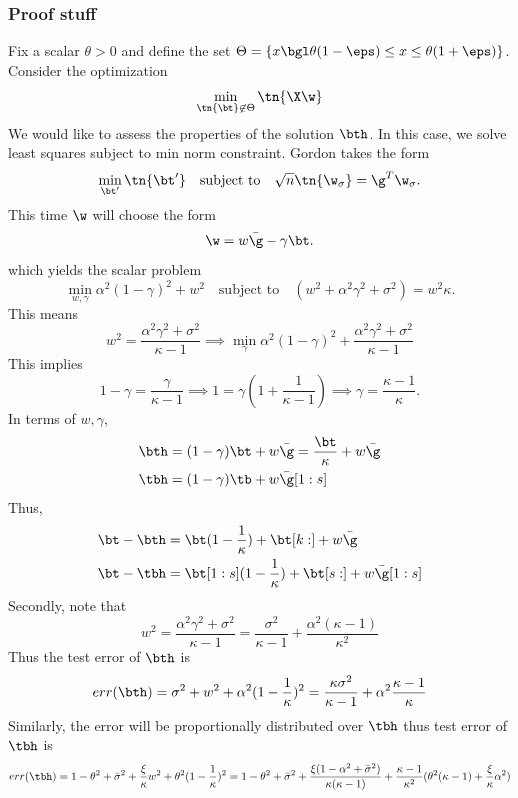 \subsubsection{Proof stuff}
Fix a scalar $\theta>0$ and define the set $\Theta=\{x\bgl \theta(1-\eps)\leq x\leq \theta(1+\eps)\}$. Consider the optimization
\[
\min_{\tn{\bt}\not\in \Theta}\tn{\X\w}
\]
We would like to assess the properties of the solution $\bth$.
In this case, we solve least squares subject to min norm constraint. Gordon takes the form
\begin{align}
\min_{\bt'} \tn{\bt'}\quad\text{subject to}\quad \sqrt{n}\tn{\w_{\sigma}}=\g^T\w_{\sigma}.
\end{align}
This time $\w$ will choose the form
\[
\w=w\bar{\g}-\gamma \bt.
\]
which yields the scalar problem
\[
\min_{w,\gamma} \alpha^2(1-\gamma)^2+w^2\quad\text{subject to}\quad (w^2+\alpha^2\gamma^2+\sigma^2)=w^2\kappa.
\]
This means
\[
w^2=\frac{\alpha^2\gamma^2+\sigma^2}{\kappa-1}\implies \min_{\gamma} \alpha^2(1-\gamma)^2+\frac{\alpha^2\gamma^2+\sigma^2}{\kappa-1}
\]
This implies
\[
1-\gamma=\frac{\gamma}{\kappa-1}\implies 1=\gamma(1+\frac{1}{\kappa-1})\implies \gamma=\frac{\kappa-1}{\kappa}.
\]
In terms of $w,\gamma$, 
\begin{align}
&\bth=(1-\gamma)\bt+w\bar{\g}=\frac{\bt}{\kappa}+w\bar{\g}\\
&\tbh=(1-\gamma)\tb+w\bar{\g}[1:s]
\end{align}
Thus,
\begin{align}
&\bt-\bth=\bt(1-\frac{1}{\kappa})+\bt[k:]+w\bar{\g}\\
&\bt-\tbh=\bt[1:s](1-\frac{1}{\kappa})+\bt[s:]+w\bar{\g}[1:s]
\end{align}
Secondly, note that
\[
w^2=\frac{\alpha^2\gamma^2+\sigma^2}{\kappa-1}=\frac{\sigma^2}{\kappa-1}+\frac{\alpha^2(\kappa-1)}{\kappa^2}
\]
Thus the test error of $\bth$ is
\[
err(\bth)=\sigma^2+w^2+\alpha^2(1-\frac{1}{\kappa})^2=\frac{\kappa \sigma^2}{\kappa-1}+\alpha^2\frac{\kappa-1}{\kappa}
\]
Similarly, the error will be proportionally distributed over $\tbh$ thus test error of $\tbh$ is
\[
err(\tbh)=1-\theta^2+\bar{\sigma}^2+\frac{\xi}{\kappa}w^2+\theta^2(1-\frac{1}{\kappa})^2=1-\theta^2+\bar{\sigma}^2+\frac{\xi (1-\alpha^2+\bar{\sigma}^2)}{\kappa(\kappa-1)}+\frac{\kappa-1}{\kappa^2}(\theta^2(\kappa-1)+\frac{\xi}{\kappa}\alpha^2)
\]